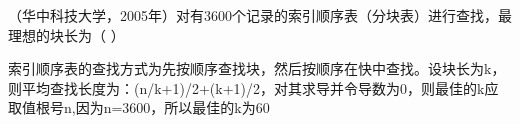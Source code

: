 \question （华中科技大学，2005年）对有3600个记录的索引顺序表（分块表）进行查找，最理想的块长为（
）
\par{}
\begin{solution}索引顺序表的查找方式为先按顺序查找块，然后按顺序在快中查找。设块长为k，则平均查找长度为：(n/k+1)/2+(k+1)/2，对其求导并令导数为0，则最佳的k应取值根号n,因为n=3600，所以最佳的k为60
\end{solution}
